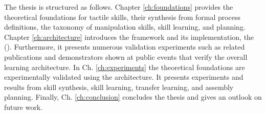 The thesis is structured as follows.
Chapter \ref{ch:foundations} provides the theoretical foundations for tactile skills, their synthesis from formal process definitions, the taxonomy of manipulation skills, skill learning, and planning.
Chapter \ref{ch:architecture} introduces the \skillmodelabbr{} framework and its implementation, the \software{} (\softwareabbr{}).
Furthermore, it presents numerous validation experiments such as related publications and demonstrators shown at public events that verify the overall learning architecture.
In Ch. \ref{ch:experiments} the theoretical foundations are experimentally validated using the architecture.
It presents experiments and results from skill synthesis, skill learning, transfer learning, and assembly planning.
Finally, Ch. \ref{ch:conclusion} concludes the thesis and gives an outlook on future work.